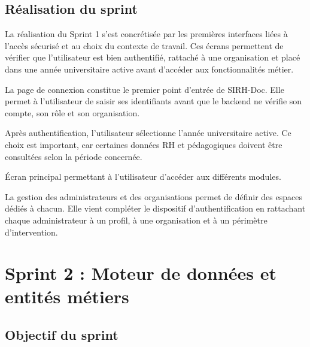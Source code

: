 \subsection{Réalisation du sprint}

La réalisation du Sprint 1 s'est concrétisée par les premières interfaces liées à l'accès sécurisé et au choix du contexte de travail. Ces écrans permettent de vérifier que l'utilisateur est bien authentifié, rattaché à une organisation et placé dans une année universitaire active avant d'accéder aux fonctionnalités métier.


La page de connexion constitue le premier point d'entrée de SIRH-Doc. Elle permet à l'utilisateur de saisir ses identifiants avant que le backend ne vérifie son compte, son rôle et son organisation.


Après authentification, l'utilisateur sélectionne l'année universitaire active. Ce choix est important, car certaines données RH et pédagogiques doivent être consultées selon la période concernée.


Écran principal permettant à l’utilisateur d’accéder aux différents modules.


La gestion des administrateurs et des organisations permet de définir des espaces dédiés à chacun. Elle vient compléter le dispositif d’authentification en rattachant chaque administrateur à un profil, à une organisation et à un périmètre d’intervention.

\section{Sprint 2 : Moteur de données et entités métiers}

\subsection{Objectif du sprint}

